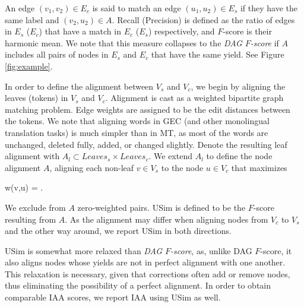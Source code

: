 \documentclass[a4paper, 11pt]{article}
\newenvironment{myequation*}{

	\begin{equation*}
}{
\end{equation*}

}
\begin{document}
An edge $(v_1,v_2) \in E_c$ is said to match an edge
$(u_1,u_2) \in E_s$ if they have the same label and $(v_2,u_2) \in A$. Recall (Precision)
is defined as the ratio of edges in $E_s$ ($E_c$) that have a match in $E_c$ ($E_s$) respectively, and
$F$-score is their harmonic mean. We note that this measure collapses to the
{\it DAG $F$-score} if $A$ includes all pairs of nodes in $E_s$ and $E_c$ that have
the same yield. See Figure \ref{fig:example}. 

In order to define the alignment between $V_s$ and $V_c$, we begin by aligning the leaves
(tokens) in $V_s$ and $V_c$.
Alignment is cast as a weighted bipartite graph matching problem. Edge weights are assigned to be the edit distances between the tokens.
We note that aligning words in GEC (and other monolingual translation tasks) is much simpler than in MT,
as most of the words are unchanged, deleted fully, added, or changed slightly.
Denote the resulting leaf alignment with $A_l \subset Leaves_s \times Leaves_c$.
We extend $A_l$ to define the node alignment $A$, aligning each non-leaf $v \in V_s$
to the node $u \in V_c$ that maximizes


\begin{small}
 \begin{myequation*}
  w\left(v,u\right) = .
 \end{myequation*}

\end{small}

\noindent
We exclude from $A$ zero-weighted pairs.
{\sc USim} is defined to be the $F$-score resulting from $A$.
As the alignment may differ when aligning nodes from $V_c$ to $V_s$
and the other way around, we report {\sc USim} in both directions.

{\sc USim} is somewhat more relaxed than {\it DAG $F$-score},
as, unlike DAG $F$-score, it also aligns nodes whose yields are not in perfect alignment with one another.
This relaxation is necessary, given that corrections often add
or remove nodes, thus eliminating the possibility of a perfect alignment.
In order to obtain comparable IAA scores, we report IAA using {\sc USim} as well.
%
\end{document}
